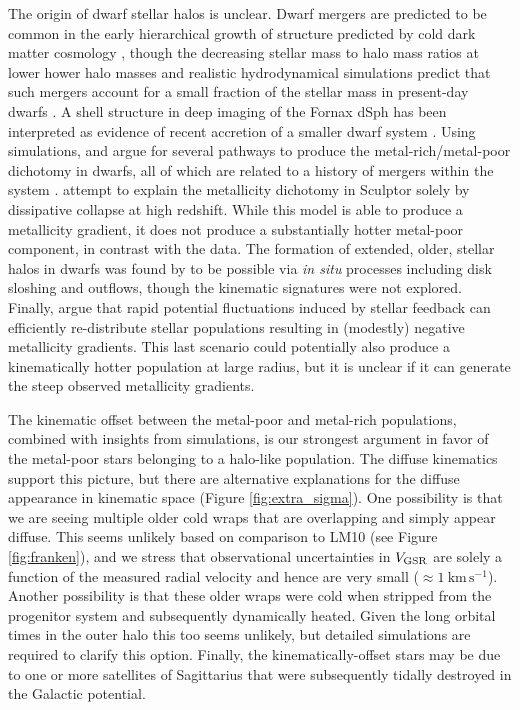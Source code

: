 \documentclass[twocolumn,tighten,twocolappendix]{aastex63}
\newcommand{\kms}{\mathrm{km} \, \mathrm{s}^{-1}}
\newcommand{\Vgsr}{V_{\rm GSR}}
\begin{document}
\begin{CJK*}{UTF8}{gbsn}
The origin of dwarf stellar halos is unclear.  Dwarf mergers are predicted to be common in the early hierarchical growth of structure predicted by cold dark matter cosmology \citep[e.g.,][]{Deason14}, though the decreasing stellar mass to halo mass ratios at lower hower halo masses and realistic hydrodynamical simulations predict that such mergers account for a small fraction of the stellar mass in present-day dwarfs \citep[e.g.,][]{Purcell07, Fitts18}.  A shell structure in deep imaging of the Fornax dSph has been interpreted as evidence of recent accretion of a smaller dwarf system \citep{Coleman04}.  Using simulations, \citet{BenitezLlamblay16} and \citet{Genina19} argue for several pathways to produce the metal-rich/metal-poor dichotomy in dwarfs, all of which are related to a history of mergers within the system \citep[see also][]{Revaz18}.  \citet{Kawata06} attempt to explain the metallicity dichotomy in Sculptor solely by dissipative collapse at high redshift.  While this model is able to produce a metallicity gradient, it does not produce a substantially hotter metal-poor component, in contrast with the data.  The formation of extended, older, stellar halos in dwarfs was found by \citep{Stinson09} to be possible via {\it in situ} processes including disk sloshing and outflows, though the kinematic signatures were not explored. Finally, \citet{El-Badry16} argue that rapid potential fluctuations induced by stellar feedback can efficiently re-distribute stellar populations resulting in (modestly) negative metallicity gradients.  This last scenario could potentially also produce a kinematically hotter population at large radius, but it is unclear if it can generate the steep observed metallicity gradients.

The kinematic offset between the metal-poor and metal-rich populations, combined with insights from simulations, is our strongest argument in favor of the metal-poor stars belonging to a halo-like population.  The diffuse kinematics support this picture, but there are alternative explanations for the diffuse appearance in kinematic space (Figure \ref{fig:extra_sigma}).  One possibility is that we are seeing multiple older cold wraps that are overlapping and simply appear diffuse.  This seems unlikely based on comparison to LM10 (see Figure \ref{fig:franken}), and we stress that observational uncertainties in $\Vgsr$ are solely a function of the measured radial velocity and hence are very small ($\approx1\ \kms$).  Another possibility is that these older wraps were cold when stripped from the progenitor system and  subsequently dynamically heated.  Given the long orbital times in the outer halo this too seems unlikely, but detailed simulations are required to clarify this option.  Finally, the kinematically-offset stars may be due to one or more satellites of Sagittarius that were subsequently tidally destroyed in the Galactic potential.


\end{CJK*}
\end{document}
